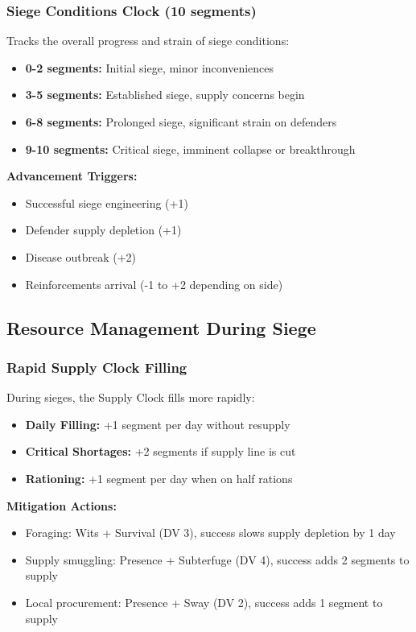 \subsubsection{Siege Conditions Clock (10 segments)}
Tracks the overall progress and strain of siege conditions:
\begin{itemize}[leftmargin=*]
    \item \textbf{0-2 segments:} Initial siege, minor inconveniences
    \item \textbf{3-5 segments:} Established siege, supply concerns begin
    \item \textbf{6-8 segments:} Prolonged siege, significant strain on defenders
    \item \textbf{9-10 segments:} Critical siege, imminent collapse or breakthrough
\end{itemize}

\textbf{Advancement Triggers:}
\begin{itemize}[leftmargin=*]
    \item Successful siege engineering (+1)
    \item Defender supply depletion (+1)
    \item Disease outbreak (+2)
    \item Reinforcements arrival (-1 to +2 depending on side)
\end{itemize}

\subsection{Resource Management During Siege}

\subsubsection{Rapid Supply Clock Filling}
During sieges, the Supply Clock fills more rapidly:
\begin{itemize}[leftmargin=*]
    \item \textbf{Daily Filling:} +1 segment per day without resupply
    \item \textbf{Critical Shortages:} +2 segments if supply line is cut
    \item \textbf{Rationing:} +1 segment per day when on half rations
\end{itemize}

\textbf{Mitigation Actions:}
\begin{itemize}[leftmargin=*]
    \item Foraging: Wits + Survival (DV 3), success slows supply depletion by 1 day
    \item Supply smuggling: Presence + Subterfuge (DV 4), success adds 2 segments to supply
    \item Local procurement: Presence + Sway (DV 2), success adds 1 segment to supply
\end{itemize}

